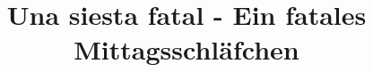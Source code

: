 \documentclass[a4paper, pagesize, DIV=15, fontsize=10pt, parskip=half, oneside, BCOR=5mm]{scrartcl}
\begin{document}
\title{Una  siesta fatal - Ein fatales Mittagsschläfchen}
\date{}

\maketitle

\newcommand{\rn}[1]{\Rnode{#1}}
\newcommand{\rl}[2]{\ncline[linestyle=solid,arrows=->,nodesepA=0.5pt,linecolor=gray, strokeopacity=0.5]{#1}{#2}}
\newcommand{\sidenote}[1]{\marginpar[#1]{#1}}



\end{document}
